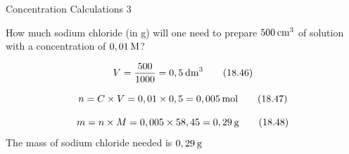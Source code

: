       \begin{wex}{Concentration Calculations 3 }\label{m38712*probfhsst!!!underscore!!!id1796}
{
\label{m38712*id283476}How much sodium chloride (in g) will one need to prepare $500\phantom{\rule{2pt}{0ex}}{\mathrm{cm}}^{3}$ of solution with a concentration of $0,01\phantom{\rule{2pt}{0ex}}\mathrm{M}$?\par 
      \vspace{5pt} }
{
    \begin{equation}
    V=\frac{500}{1 000}=0,5\phantom{\rule{2pt}{0ex}}{\mathrm{dm}}^{3}\tag{18.46}
      \end{equation}
      \label{m38712*id283565}\nopagebreak\noindent{}
        
    \begin{equation}
    n=C\ensuremath{\times}V=0,01\ensuremath{\times}0,5=0,005\phantom{\rule{2pt}{0ex}}\mathrm{mol}\tag{18.47}
      \end{equation}
      \label{m38712*id283636}\nopagebreak\noindent{}
        
    \begin{equation}
    m=n\ensuremath{\times}M=0,005\ensuremath{\times}58,45=0,29\phantom{\rule{2pt}{0ex}}\mathrm{g}\tag{18.48}
      \end{equation}
      \label{m38712*id283684}The mass of sodium chloride needed is $0,29\phantom{\rule{2pt}{0ex}}\mathrm{g}$
 \par 
}
    \end{wex}
    \noindent
\label{m38712*secfhsst!!!underscore!!!id1879}

